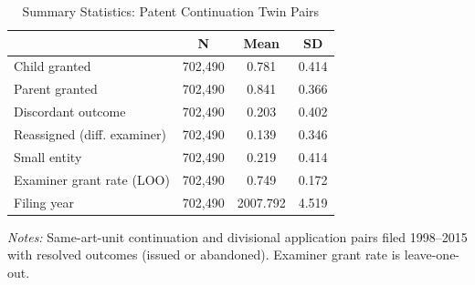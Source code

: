 \begin{table}[t]
\centering
\caption{Summary Statistics: Patent Continuation Twin Pairs}
\label{tab:summary}
\begin{tabular}{lccc}
\hline\hline
 & N & Mean & SD \\
\hline
Child granted & 702,490 & 0.781 & 0.414 \\
Parent granted & 702,490 & 0.841 & 0.366 \\
Discordant outcome & 702,490 & 0.203 & 0.402 \\
Reassigned (diff. examiner) & 702,490 & 0.139 & 0.346 \\
Small entity & 702,490 & 0.219 & 0.414 \\
Examiner grant rate (LOO) & 702,490 & 0.749 & 0.172 \\
Filing year & 702,490 & 2007.792 & 4.519 \\
\hline\hline
\end{tabular}
\begin{tablenotes}[flushleft]
\small
\item \textit{Notes:} Same-art-unit continuation and divisional application pairs filed 1998--2015 with resolved outcomes (issued or abandoned). Examiner grant rate is leave-one-out.
\end{tablenotes}
\end{table}
